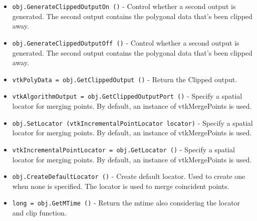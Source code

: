 \begin{itemize}
\item  \verb|obj.GenerateClippedOutputOn ()| -  Control whether a second output is generated. The second output
 contains the polygonal data that's been clipped away.

\item  \verb|obj.GenerateClippedOutputOff ()| -  Control whether a second output is generated. The second output
 contains the polygonal data that's been clipped away.

\item  \verb|vtkPolyData = obj.GetClippedOutput ()| -  Return the Clipped output.

\item  \verb|vtkAlgorithmOutput = obj.GetClippedOutputPort ()| -  Specify a spatial locator for merging points. By default, an
 instance of vtkMergePoints is used.

\item  \verb|obj.SetLocator (vtkIncrementalPointLocator locator)| -  Specify a spatial locator for merging points. By default, an
 instance of vtkMergePoints is used.

\item  \verb|vtkIncrementalPointLocator = obj.GetLocator ()| -  Specify a spatial locator for merging points. By default, an
 instance of vtkMergePoints is used.

\item  \verb|obj.CreateDefaultLocator ()| -  Create default locator. Used to create one when none is specified. The 
 locator is used to merge coincident points.

\item  \verb|long = obj.GetMTime ()| -  Return the mtime also considering the locator and clip function.

\end{itemize}
